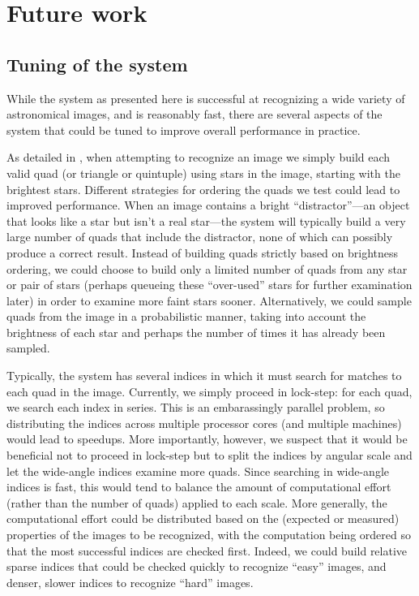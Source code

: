 \section{Future work}

\subsection{Tuning of the \an system}

While the \an system as presented here is successful at recognizing a
wide variety of astronomical images, and is reasonably fast, there are
several aspects of the system that could be tuned to improve overall
performance in practice.


As detailed in , when attempting to recognize
an image we simply build each valid quad (or triangle or quintuple)
using stars in the image, starting with the brightest stars.
Different strategies for ordering the quads we test could lead to
improved performance.  When an image contains a bright
``distractor''---an object that looks like a star but isn't a real
star---the system will typically build a very large number of quads
that include the distractor, none of which can possibly produce a
correct result.  Instead of building quads strictly based on
brightness ordering, we could choose to build only a limited number of
quads from any star or pair of stars (perhaps queueing these
``over-used'' stars for further examination later) in order to examine
more faint stars sooner.  Alternatively, we could sample quads from
the image in a probabilistic manner, taking into account the
brightness of each star and perhaps the number of times it has already
been sampled.


Typically, the \an system has several indices in which it must search
for matches to each quad in the image.  Currently, we simply proceed
in lock-step: for each quad, we search each index in series.  This is
an embarassingly parallel problem, so distributing the indices across
multiple processor cores (and multiple machines) would lead to
speedups.  More importantly, however, we suspect that it would be
beneficial not to proceed in lock-step but to split the indices by
angular scale and let the wide-angle indices examine more quads.
Since searching in wide-angle indices is fast, this would tend to
balance the amount of computational effort (rather than the number of
quads) applied to each scale.  More generally, the computational
effort could be distributed based on the (expected or measured)
properties of the images to be recognized, with the computation being
ordered so that the most successful indices are checked first.
Indeed, we could build relative sparse indices that could be checked
quickly to recognize ``easy'' images, and denser, slower indices to
recognize ``hard'' images.



